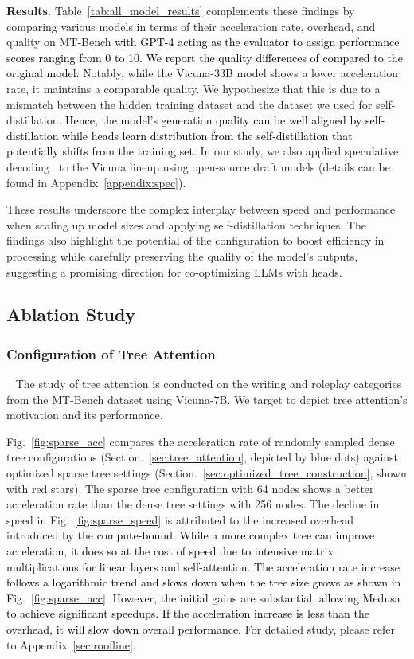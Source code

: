 \textbf{Results.}
Table~\ref{tab:all_model_results} complements these findings by comparing various  models in terms of their acceleration rate, overhead, and quality on MT-Bench \textcolor{black}{with GPT-4 acting as the evaluator to assign performance scores ranging from 0 to 10. We report the quality differences of \ours compared to the original model. 
} 
Notably, while the  Vicuna-33B model shows a lower acceleration rate, it maintains a comparable quality. We hypothesize that this is due to a mismatch between the hidden training dataset and the dataset we used for self-distillation. \textcolor{black}{Hence, the model's generation quality can be well aligned by self-distillation while \ours heads learn distribution from the self-distillation that potentially shifts from the training set.}
In our study, we also applied speculative decoding~\citep{chen2023accelerating,leviathan2022fast} to the Vicuna lineup using open-source draft models (details can be found
in Appendix~\ref{appendix:spec}).


These results underscore the complex interplay between speed and performance when scaling up model sizes and applying self-distillation techniques. The findings also highlight the potential of the  configuration to boost efficiency in processing while carefully preserving the quality of the model's outputs, suggesting a promising direction for co-optimizing LLMs with \ours heads.




\subsection{Ablation Study}
\subsubsection{Configuration of Tree Attention}~\label{section:config of tree}
The study of tree attention is conducted on the writing and roleplay categories from the MT-Bench dataset using  Vicuna-7B. We target to depict tree attention's motivation and its performance. 

Fig.~\ref{fig:sparse_acc} compares the acceleration rate of randomly sampled dense tree configurations (Section.~\ref{sec:tree_attention}, depicted by blue dots) against optimized sparse tree settings (Section.~\ref{sec:optimized_tree_construction}, shown with red stars). The sparse tree configuration with 64 nodes shows a better acceleration rate than the dense tree settings with 256 nodes.
The decline in speed in Fig.~\ref{fig:sparse_speed} is attributed to the increased overhead introduced by the \textcolor{black}{compute-bound. While a more complex tree can improve acceleration, it does so at the cost of speed due to intensive matrix multiplications for linear layers and self-attention. The acceleration rate increase follows a logarithmic trend and slows down when the tree size grows as shown in Fig.~\ref{fig:sparse_acc}. However, the initial gains are substantial, allowing Medusa to achieve significant speedups. If the acceleration increase is less than the overhead, it will slow down overall performance.} For detailed study, please refer to Appendix~\ref{sec:roofline}.

